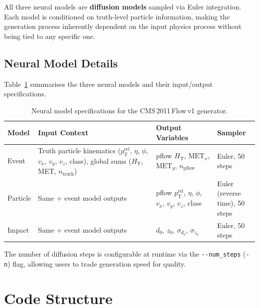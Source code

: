 \documentclass[11pt,a4paper]{article}
\begin{document}
All three neural models are \textbf{diffusion models} sampled via Euler integration.
Each model is conditioned on truth-level particle information, making the generation
process inherently dependent on the input physics process without being tied to any
specific one.

\subsection{Neural Model Details}

Table~\ref{tab:models} summarises the three neural models and their input/output
specifications.

\begin{table}[H]
\centering
\caption{Neural model specifications for the CMS\,2011\,Flow\,v1 generator.}
\label{tab:models}
\begin{tabular}{@{}llll@{}}
\toprule
\textbf{Model} & \textbf{Input Context} & \textbf{Output Variables} & \textbf{Sampler} \\
\midrule
Event & \makecell[l]{Truth particle kinematics\\
  ($p_\mathrm{T}^\mathrm{rel}$, $\eta$, $\phi$, $v_x$, $v_y$, $v_z$, class),\\
  global sums ($H_\mathrm{T}$, MET, $n_\mathrm{truth}$)}
  & \makecell[l]{pflow $H_\mathrm{T}$,\\$\mathrm{MET}_x$, $\mathrm{MET}_y$,\\$n_\mathrm{pflow}$}
  & Euler, 50 steps \\
\addlinespace
Particle & Same + event model outputs
  & \makecell[l]{pflow $p_\mathrm{T}^\mathrm{rel}$, $\eta$, $\phi$,\\$v_x$, $v_y$, $v_z$, class}
  & \makecell[l]{Euler (reverse\\time), 50 steps} \\
\addlinespace
Impact & Same + event model outputs
  & $d_0$, $z_0$, $\sigma_{d_0}$, $\sigma_{z_0}$
  & Euler, 50 steps \\
\bottomrule
\end{tabular}
\end{table}

The number of diffusion steps is configurable at runtime via the \texttt{-{}-num\_steps}
(\texttt{-n}) flag, allowing users to trade generation speed for quality.

\section{Code Structure}
\label{sec:code-structure}
\end{document}
